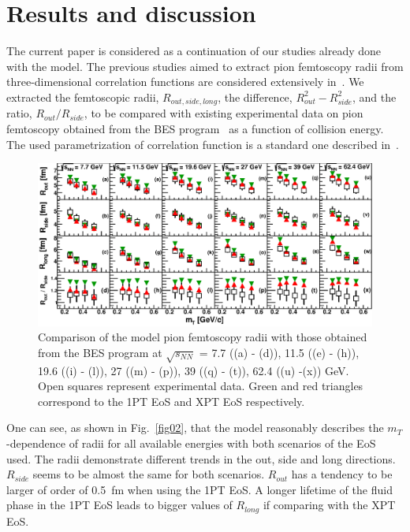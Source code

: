 \documentclass[a4paper]{panl}
\begin{document}
  \section*{Results and discussion}
  The current paper is considered as a continuation of our studies already done with the model. The previous studies aimed to extract pion 
  femtoscopy radii from three-dimensional   correlation functions are considered extensively in~\cite{Batyuk:2017smw}.
  We extracted the femtoscopic radii, $R_{out, side, long}$, the difference, $R^{2}_{out} - R^{2}_{side}$, and the ratio, $R_{out} / R_{side}$, 
  to be compared with existing experimental data on pion femtoscopy obtained from the BES program~\cite{Adamczyk:2014mxp} as a function 
  of collision energy. 
  The used parametrization of correlation function is a standard one described in~\cite{Pratt:1986cc, Bertsch:1988db}.
  \begin{figure}[t]
    \begin{center}
      \includegraphics[width=115mm]{fig2.eps}
      \vspace{-3mm}
      \caption{Comparison of the model pion femtoscopy radii with those obtained from the BES program at
        $\sqrt{s_{NN}}$ = 7.7 ((a) - (d)), 11.5 ((e) - (h)), 19.6 ((i) - (l)), 27 ((m) - (p)), 39 ((q) - (t)), 62.4 ((u) -(x)) GeV.
        Open squares represent experimental data. Green and red triangles correspond to the 1PT EoS and XPT EoS respectively.}
    \end{center}
    \vspace{-5mm}
  \end{figure}

  One can see, as shown in Fig.~\ref{fig02}, that the model reasonably describes the $m_{T}$-dependence of radii for all available 
  energies with both scenarios of the EoS used.
  The radii demonstrate different trends in the out, side and long directions. $R_{side}$ seems to be almost the same for both scenarios.
  $R_{out}$ has a tendency to be larger of order of 0.5~fm when using the 1PT EoS.
  A longer lifetime of the fluid phase in the 1PT EoS leads to bigger values of $R_{long}$ if comparing with the XPT EoS.
\end{document}
